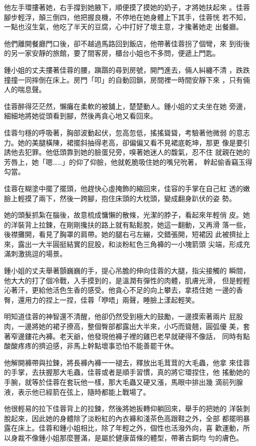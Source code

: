 他左手環摟著她，右手撐到她腋下，順便摸了摸她的奶子，才將她扶起來
。佳蓉腳步輕浮，顛三倒四，他把握良機，不停地在她身體上下其手，佳蓉恍
若不知，一點也沒生氣，他吃了半天的豆腐，心中打好了壞主意，才攙著她走
出餐廳。

他們離開餐廳門口後，卻不越過馬路回到飯店，他帶著佳蓉拐了個彎，來
到街後的另一家安靜的旅館，要了間客房，櫃台小姐也不多問，便遞上門匙。

鍾小姐的丈夫摟著佳蓉的腰，蹎躓的尋到房號，開門進去，倆人糾纏不清
，跌跌撞撞一同摔倒在床上。房門「叩」的自動回鎖，房間裡一時間安靜下來
，只有倆人的喘息聲。

佳蓉醉得茫茫然，懶癱在柔軟的被舖上，楚楚動人。鍾小姐的丈夫坐在她
旁邊，細細地將她從頭看到腳，然後再貪心地又看回來。

佳蓉勻穩的呼吸著，胸部波動起伏，忽高忽低，搖搖聳聳，考驗著他微弱
的意志力。她的美腿橫陳，裙擺斜抽得老高，卻偏偏又看不見裙底乾坤，那更
像是要引誘他去犯罪。他低頭靠到她的臉蛋兒旁，嗅著她迷人的馥氣，忍不住
就親在她的芳唇上，她「嗯……」的仰了仰臉，他就乾脆吸住她的嘴兒吮著，
幹起偷香竊玉得勾當。

佳蓉在糊塗中擺了擺頭，他趕快心虛掩飾的縮回來，佳容的手掌在自己紅
透的嫩臉上輕摸了兩下，然後一跨腳，抱住床頭的大枕頭，變成翻身趴伏的姿
勢。

她的頭髮抓紮在腦後，故意梳成慵懶的散條，光潔的脖子，看起來年輕俏
皮。她的洋裝背上拉鍊，在剛剛攙扶的路上就有點鬆脫，她這一翻動，又再滑
落一些，後襟攤開，看見了胸罩的肩帶。她的腿右弓左繃，交錯張開，短裙因
此被擠扯上來，露出一大半圓挺結實的屁股，和淡粉紅色三角褲的一小塊箭頭
尖端，形成充滿刺激挑逗的場景。

鍾小姐的丈夫舉著顫巍巍的手，提心吊膽的伸向佳蓉的大腿，指尖接觸的
瞬間，他大大的打了個冷戰，入手摸到的，是溫潤有彈性的肉體，肌膚光滑，
但是輕輕沁著汗，更給他活色生香的感受。他貪心不足的向上攀去，拿捂住她
一邊的香臀，還用力的捏上一捏，佳蓉「咿唔」兩聲，睡臉上漾起輕笑。

明知道佳蓉的神智還不清醒，他卻仍然受到極大的鼓勵，一邊摸索著兩片
屁股肉，一邊將她的裙子撩高，整個臀部都露出大半來，小巧而聳翹，圓弧優
美，套著窄邊鏤花內褲。老天爺，他發現他褲子裡的雞巴老早就硬得不像話，
同時有點酸酸疼疼的擠迫感，非馬上幹點壞事恐怕不能善罷干休。

他解開褲帶與拉鍊，將長褲內褲一一褪去，釋放出毛茸茸的大毛蟲，他拿
來佳蓉的手掌，去扶握那大毛蟲，佳蓉或者是順手習慣，真的將它環捏住，他
搖動她的手腕，就等於佳蓉在套玩他一樣，那大毛蟲又硬又漲，馬眼中排出幾
滴前列腺液，表示他已經箭在弦上，隨時都能上戰場了。

他很輕易的拉下佳蓉背上的拉鍊，然後將她扳轉仰躺回來，舉手的把她的
洋裝剝脫起來，因此她的身體除了淡粉紅的內衣褲和淺茶色高跟鞋之外，全部
都擺明暴露在床上。佳蓉和鍾小姐相比，除了年輕之外，個性也活潑外向，喜
歡運動，所以身裁不像鍾小姐那麼豐滿，是屬於健康苗條的體型，帶著古銅均
勻的膚色。

